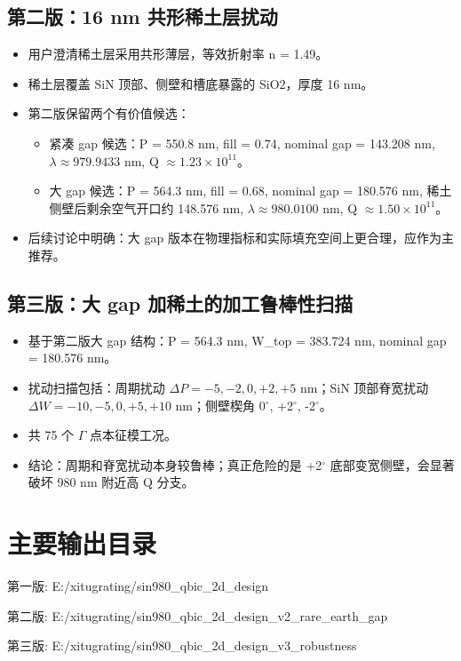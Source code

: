 \documentclass[11pt,a4paper]{ctexart}
\begin{document}
\subsection{第二版：16 nm 共形稀土层扰动}
\begin{itemize}
  \item 用户澄清稀土层采用共形薄层，等效折射率 n = 1.49。
  \item 稀土层覆盖 SiN 顶部、侧壁和槽底暴露的 SiO2，厚度 16 nm。
  \item 第二版保留两个有价值候选：
    \begin{itemize}
      \item 紧凑 gap 候选：P = 550.8 nm, fill = 0.74, nominal gap = 143.208 nm, $\lambda \approx 979.9433$ nm, Q $\approx 1.23\times10^{11}$。
      \item 大 gap 候选：P = 564.3 nm, fill = 0.68, nominal gap = 180.576 nm, 稀土侧壁后剩余空气开口约 148.576 nm, $\lambda \approx 980.0100$ nm, Q $\approx 1.50\times10^{11}$。
    \end{itemize}
  \item 后续讨论中明确：大 gap 版本在物理指标和实际填充空间上更合理，应作为主推荐。
\end{itemize}

\subsection{第三版：大 gap 加稀土的加工鲁棒性扫描}
\begin{itemize}
  \item 基于第二版大 gap 结构：P = 564.3 nm, W\_top = 383.724 nm, nominal gap = 180.576 nm。
  \item 扰动扫描包括：周期扰动 $\Delta P = -5,-2,0,+2,+5$ nm；SiN 顶部脊宽扰动 $\Delta W = -10,-5,0,+5,+10$ nm；侧壁楔角 0$^\circ$, +2$^\circ$, -2$^\circ$。
  \item 共 75 个 $\Gamma$ 点本征模工况。
  \item 结论：周期和脊宽扰动本身较鲁棒；真正危险的是 +2$^\circ$ 底部变宽侧壁，会显著破坏 980 nm 附近高 Q 分支。
\end{itemize}

\section{主要输出目录}
\begin{ExactText}
第一版:
E:/xitugrating/sin980_qbic_2d_design

第二版:
E:/xitugrating/sin980_qbic_2d_design_v2_rare_earth_gap

第三版:
E:/xitugrating/sin980_qbic_2d_design_v3_robustness
\end{ExactText}
\end{document}
